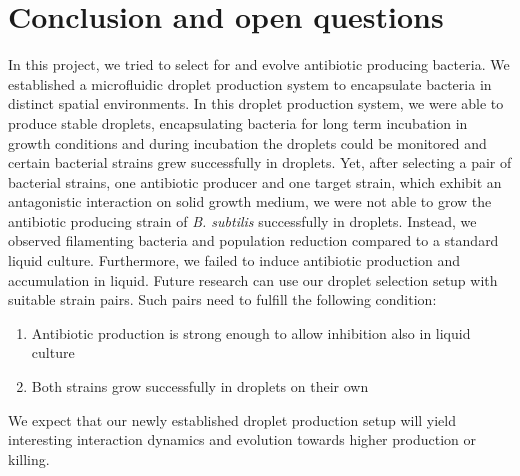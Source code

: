 \chapter{Conclusion and open questions}
\label{chap:droplets_conclusion}

In this project, we tried to select for and evolve antibiotic producing bacteria. We established a microfluidic droplet production system to encapsulate bacteria in distinct spatial environments. In this droplet production system, we were able to produce stable droplets, encapsulating bacteria for long term incubation in growth conditions and during incubation the droplets could be monitored and certain bacterial strains grew successfully in droplets.
Yet, after selecting a pair of bacterial strains, one antibiotic producer and one target strain, which exhibit an antagonistic interaction on solid growth medium, we were not able to grow the antibiotic producing strain of \textit{B. subtilis} successfully in droplets. Instead, we observed filamenting bacteria and population reduction compared to a standard liquid culture. Furthermore, we failed to induce antibiotic production and accumulation in liquid. 
Future research can use our droplet selection setup with suitable strain pairs. Such pairs need to fulfill the following condition:
\begin{enumerate}
    \item Antibiotic production is strong enough to allow inhibition also in liquid culture
    \item Both strains grow successfully in droplets on their own
\end{enumerate}
We expect that our newly established droplet production setup will yield interesting interaction dynamics and evolution towards higher production or killing.